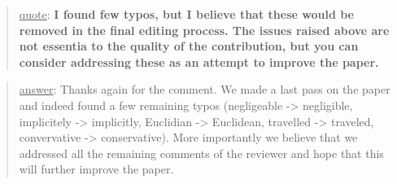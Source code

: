 \documentclass[a4paper]{article}
\newcommand\quot[1]{\begin{quote} \underline{quote}: \textbf{#1}\end{quote}}
\newcommand\as[1]{\begin{quote} \underline{answer}: {#1}\end{quote} }
\begin{document}
\quot{I found few typos, but I believe that these would be removed in the
final editing process. 
The issues raised above are not essentia to the quality of the
contribution, but you can consider addressing these as an attempt to
improve the paper. }
\as{Thanks again for the comment. We made a last pass on the paper and indeed found a few remaining typos (negligeable -> negligible, implicitely -> implicitly, Euclidian -> Euclidean, travelled -> traveled, convervative -> conservative). More importantly we believe that we addressed all the remaining comments of the reviewer and hope that this will further improve the paper.}
\end{document}
